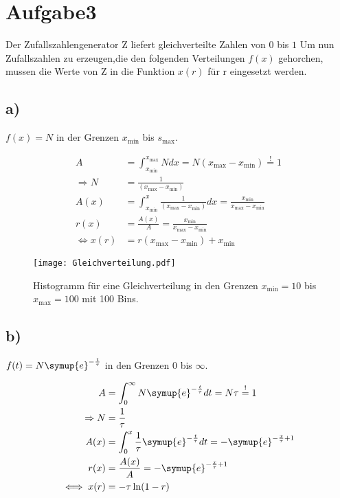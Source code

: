 \newpage
\section{Aufgabe3}
\label{sec:a3}
Der Zufallszahlengenerator Z liefert gleichverteilte Zahlen von $0$ bis $1$
Um nun Zufallszahlen zu erzeugen,die den folgenden Verteilungen $f(x)$ gehorchen,
mussen die Werte von Z in die Funktion $x(r)$ für r eingesetzt werden.


\subsection{a)}
\label{subsec:a3a}
$f(x)=N$ in der Grenzen $x_\text{min}$ bis $s_\text{max}$.

\begin{align}
A&=\int_{x_\text{min}}^{x_\text{max}} N dx=
N(x_\text{max}-x_\text{min})\stackrel{!}{=}1\\
\Rightarrow N&=\frac{1}{(x_\text{max}-x_\text{min})}\\
A(x)&=\int_{x_\text{min}}^{x}\frac{1}{(x_\text{max}-x_\text{min})}dx=\frac{x_\text{min}}{x_\text{max}-x_\text{min}}\\
r(x)&=\frac{A(x)}{A}=\frac{x_\text{min}}{x_\text{max}-x_\text{min}}\\
\iff x(r)&=r(x_\text{max}-x_\text{min})+x_\text{min}
\end{align}


\begin{figure}
  \centering
  \texttt{[image: Gleichverteilung.pdf]}
  \caption{Histogramm für eine Gleichverteilung in den Grenzen $x_\text{min}=10$ bis $x_\text{max}=100$ mit 100 Bins.}
  \label{fig:gleich}
\end{figure}
\FloatBarrier

\subsection{b)}
\label{subsec:a3b}
$f(t)=N\symup{e}^{-\frac{t}{\tau}}$ in den Grenzen $0$ bis $\infty$.

\begin{align}
A&=\int_0^{\infty}N\symup{e}^{-\frac{t}{\tau}}dt=N\tau\stackrel{!}{=}1\\
\Rightarrow N&=\frac{1}{\tau}\\
A(x)&=\int_0^x \frac{1}{\tau}\symup{e}^{-\frac{t}{\tau}}dt=-\symup{e}^{-\frac{x}{\tau}+1}\\
r(x)&=\frac{A(x)}{A}=-\symup{e}^{-\frac{x}{\tau}+1}\\
\iff x(r)&=-\tau\ln(1-r)
\end{align}


